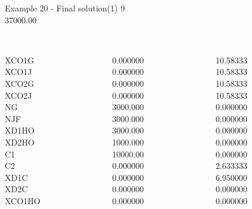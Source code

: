 \begin{frame}{Example 20 - Final solution(1)}
\footnotesize
{}  9\\
  37000.00\\

\begin{columns}[t]
\begin{column}{0.3\textwidth}
\\
XCO1G\\
XCO1J\\
XCO2G\\
XCO2J\\
NG\\
NJF\\
XD1HO\\
XD2HO\\
C1\\
C2\\
XD1C\\
XD2C\\
XCO1HO\\
\end{column}

\begin{column}{0.3\textwidth}
\\
0.000000\\
0.000000\\
0.000000\\
0.000000\\
3000.000\\
3000.000\\
3000.000\\
1000.000\\
10000.00\\
0.000000\\
0.000000\\
0.000000\\
0.000000\\
\end{column}  

\begin{column}{0.3\textwidth}
\\
10.58333\\
10.58333\\
10.58333\\
10.58333\\
0.000000\\
0.000000\\
0.000000\\
0.000000\\
0.000000\\
2.633333\\
6.950000\\
0.000000\\
0.000000\\
\end{column}
\end{columns}
\end{frame}


